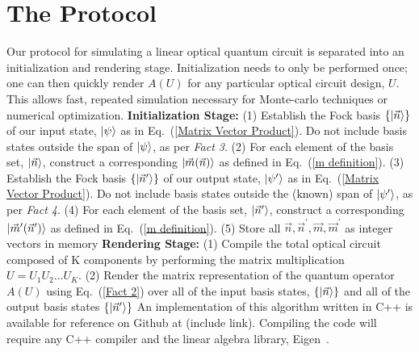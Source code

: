 \documentclass[aps,pra,twocolumn,showpacs,superscriptaddress,floatfix,10pt]{revtex4}
\begin{document}
\section{The Protocol}
\label{Section on Protocol}
Our protocol for simulating a linear optical quantum circuit is separated into an initialization and rendering stage. Initialization needs to only be performed once; one can then quickly render $A(U)$ for any particular optical circuit design, $U$. This allows fast, repeated simulation necessary for Monte-carlo techniques or numerical optimization.
\newline
\newline
\textbf{Initialization Stage:}
\newline
\newline
		(1)  Establish the Fock basis $\{\ket{\vec{n}} \}$ of our input state, $\ket{\psi}$ as in Eq.~(\ref{Matrix Vector Product}). Do not include basis states outside the span of $\ket{\psi}$, as per \textit{Fact 3}.
		\newline
		\newline
		(2) For each element of the basis set, $\ket{\vec{n}}$, construct a corresponding $\ket{\vec{m}(\vec{n})}$ as defined in Eq.~(\ref{m definition}).
		\newline
		\newline
		(3) Establish the Fock basis $\{\ket{\vec{n}^\prime}\}$ of our output state, $\ket{\psi^\prime}$ as in Eq.~(\ref{Matrix Vector Product}). Do not include basis states outside the (known) span of $\ket{\psi^\prime}$, as per \textit{Fact 4}.
		\newline
		\newline
		(4)  For each element of the basis set, $\ket{\vec{n}^\prime}$, construct a corresponding $\ket{\vec{m}^\prime(\vec{n}^\prime)}$ as defined in Eq.~(\ref{m definition}).
		\newline
		\newline
		(5) Store all $\vec{n}, \vec{n}^\prime, \vec{m}, \vec{m}^\prime$ as integer vectors in memory
		\newline
		\newline
\textbf{Rendering Stage:}
\newline
\newline
		(1)  Compile the total optical circuit composed of K components by performing the matrix multiplication $ U = U_1 U_2 \dots U_K $.
		\newline
		\newline
		(2) Render the matrix representation of the quantum operator $A(U)$ using Eq.~(\ref{Fact 2}) over all of the input basis states, $\{\ket{\vec{n}}\}$ and all of the output basis states $\{\ket{\vec{n}^\prime}\}$
\newline
\newline
An implementation of this algorithm written in C++ is available for reference on Github at (include link). Compiling the code will require any C++ compiler and the linear algebra library, Eigen~\cite{EIGEN}.
\end{document}
